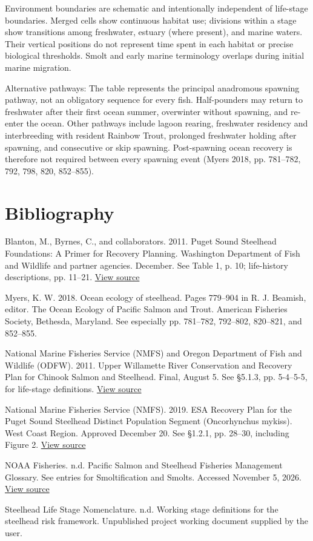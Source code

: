 \documentclass[10pt,letterpaper]{article}
\begin{document}
Environment boundaries are schematic and intentionally independent of life-stage boundaries. Merged cells show continuous habitat use; divisions within a stage show transitions among freshwater, estuary (where present), and marine waters. Their vertical positions do not represent time spent in each habitat or precise biological thresholds. Smolt and early marine terminology overlaps during initial marine migration.

Alternative pathways: The table represents the principal anadromous spawning pathway, not an obligatory sequence for every fish. Half-pounders may return to freshwater after their first ocean summer, overwinter without spawning, and re-enter the ocean. Other pathways include lagoon rearing, freshwater residency and interbreeding with resident Rainbow Trout, prolonged freshwater holding after spawning, and consecutive or skip spawning. Post-spawning ocean recovery is therefore not required between every spawning event (Myers 2018, pp. 781–782, 792, 798, 820, 852–855).

\section*{Bibliography}
Blanton, M., Byrnes, C., and collaborators. 2011. Puget Sound Steelhead Foundations: A Primer for Recovery Planning. Washington Department of Fish and Wildlife and partner agencies. December. See Table 1, p. 10; life-history descriptions, pp. 11–21. \href{https://wdfw.wa.gov/sites/default/files/publications/01512/wdfw01512.pdf}{View source}

Myers, K. W. 2018. Ocean ecology of steelhead. Pages 779–904 in R. J. Beamish, editor. The Ocean Ecology of Pacific Salmon and Trout. American Fisheries Society, Bethesda, Maryland. See especially pp. 781–782, 792–802, 820–821, and 852–855.

National Marine Fisheries Service (NMFS) and Oregon Department of Fish and Wildlife (ODFW). 2011. Upper Willamette River Conservation and Recovery Plan for Chinook Salmon and Steelhead. Final, August 5. See §5.1.3, pp. 5-4–5-5, for life-stage definitions. \href{https://repository.library.noaa.gov/view/noaa/15981/noaa_15981_DS1.pdf}{View source}

National Marine Fisheries Service (NMFS). 2019. ESA Recovery Plan for the Puget Sound Steelhead Distinct Population Segment (Oncorhynchus mykiss). West Coast Region. Approved December 20. See §1.2.1, pp. 28–30, including Figure 2. \href{https://www.fisheries.noaa.gov/s3/dam-migration/final_puget_sound_steelhead_recovery_plan.pdf}{View source}

NOAA Fisheries. n.d. Pacific Salmon and Steelhead Fisheries Management Glossary. See entries for Smoltification and Smolts. Accessed November 5, 2026. \href{https://www.fisheries.noaa.gov/west-coast/sustainable-fisheries/pacific-salmon-and-steelhead-fisheries-management-glossary}{View source}

Steelhead Life Stage Nomenclature. n.d. Working stage definitions for the steelhead risk framework. Unpublished project working document supplied by the user.
\end{document}
